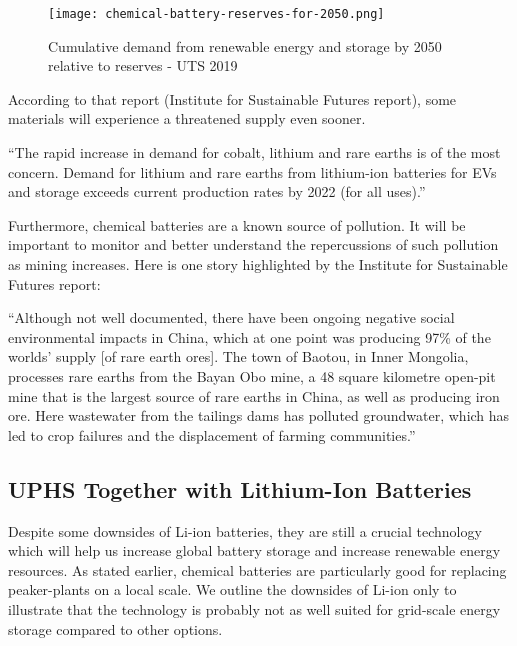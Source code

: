 \documentclass[hidelinks,12pt,a4paper]{article}
\begin{document}
\begin{figure}[ht!]
    \centering
    \texttt{[image: chemical-battery-reserves-for-2050.png]}
    \caption{Cumulative demand from renewable energy and storage by 2050 relative to reserves -  UTS 2019 \cite{ResponsibleMineralsSourcingForRenewableEnergy}}
\end{figure}
\FloatBarrier

According to that report (Institute for Sustainable Futures report), some materials will experience a threatened supply even sooner.

\begin{displayquote}
“The rapid increase in demand for cobalt, lithium and rare earths is of the most concern. Demand for lithium and rare earths from lithium-ion batteries for EVs and storage exceeds current production rates by 2022 (for all uses).” \cite{ResponsibleMineralsSourcingForRenewableEnergy}
\end{displayquote}

Furthermore, chemical batteries are a known source of pollution. It will be important to monitor and better understand the repercussions of such pollution as mining increases. Here is one story highlighted by the Institute for Sustainable Futures report:

\begin{displayquote}
“Although not well documented, there have been ongoing negative social environmental impacts in China, which at one point was producing 97\% of the worlds’ supply [of rare earth ores]. The town of Baotou, in Inner Mongolia, processes rare earths from the Bayan Obo mine, a 48 square kilometre open-pit mine that is the largest source of rare earths in China, as well as producing iron ore. Here wastewater from the tailings dams has polluted groundwater, which has led to crop failures and the displacement of farming communities.” \cite{ResponsibleMineralsSourcingForRenewableEnergy}
\end{displayquote}

\subsection{UPHS Together with Lithium-Ion Batteries}
Despite some downsides of Li-ion batteries, they are still a crucial technology which will help us increase global battery storage and increase renewable energy resources. As stated earlier, chemical batteries are particularly good for replacing peaker-plants on a local scale. We outline the downsides of Li-ion only to illustrate that the technology is probably not as well suited for grid-scale energy storage compared to other options.
\end{document}
